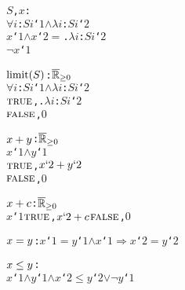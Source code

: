 \begin{alltt}
  \pvsid{(}\(S\), \(x\)\pvsid{)}:  \pvskey{=}
       \pvsid{(}\(\forall\) \(i\): \(S\)\pvsid{(}\(i\)\pvsid{)}`\(1\)\pvsid{)} \(\wedge\) \pvsid{(}\(\lambda\) \(i\): \(S\)\pvsid{(}\(i\)\pvsid{)}`\(2\)\pvsid{)}
         \(x\)`\(1\) \(\wedge\) \(x\)`\(2\) \(=\) .\pvsid{(}\(\lambda\) \(i\): \(S\)\pvsid{(}\(i\)\pvsid{)}`\(2\)\pvsid{)}
       \(\neg\) \(x\)`\(1\)
      \vspace*{\pvsdeclspacing}

  \(\xunderscorelimitonefn{S}\): \({\pvssubscript{\overline{\mathbb{R}}}{{\geq}0}}\) \pvskey{=}
       \pvsid{(}\(\forall\) \(i\): \(S\)\pvsid{(}\(i\)\pvsid{)}`\(1\)\pvsid{)} \(\wedge\) \pvsid{(}\(\lambda\) \(i\): \(S\)\pvsid{(}\(i\)\pvsid{)}`\(2\)\pvsid{)}
         \pvsid{(}\({\pvskey{TRUE}}\), .\pvsid{(}\(\lambda\) \(i\): \(S\)\pvsid{(}\(i\)\pvsid{)}`\(2\)\pvsid{)}\pvsid{)}
       \pvsid{(}\({\pvskey{FALSE}}\), \(0\)\pvsid{)}
      \vspace*{\pvsdeclspacing}

  \(\xunderscoreaddtwofn{x}{y}\): \({\pvssubscript{\overline{\mathbb{R}}}{{\geq}0}}\) \pvskey{=}
       \(x\)`\(1\) \(\wedge\) \(y\)`\(1\)
         \pvsid{(}\({\pvskey{TRUE}}\), \(\opplustwofn{x`2}{y`2}\)\pvsid{)}
       \pvsid{(}\({\pvskey{FALSE}}\), \(0\)\pvsid{)}
      \vspace*{\pvsdeclspacing}

  \(\xunderscoreaddtwofn{x}{c}\): \({\pvssubscript{\overline{\mathbb{R}}}{{\geq}0}}\) \pvskey{=}
       \(x\)`\(1\)  \pvsid{(}\({\pvskey{TRUE}}\), \(\opplustwofn{x`2}{c}\)\pvsid{)}  \pvsid{(}\({\pvskey{FALSE}}\), \(0\)\pvsid{)} \vspace*{\pvsdeclspacing}

  \(\xunderscoreeqtwofn{x}{y}\):  \pvskey{=} \pvsid{(}\(x\)`\(1\) \(=\) \(y\)`\(1\)\pvsid{)} \(\wedge\) \pvsid{(}\(x\)`\(1\) \(\Rightarrow\) \(x\)`\(2\) \(=\) \(y\)`\(2\)\pvsid{)}\vspace*{\pvsdeclspacing}

  \(\xunderscoreletwofn{x}{y}\):  \pvskey{=}
      \pvsid{(}\(x\)`\(1\) \(\wedge\) \(y\)`\(1\) \(\wedge\) \(x\)`\(2\) \(\leq\) \(y\)`\(2\)\pvsid{)} \(\vee\) \pvsid{(}\(\neg\) \(y\)`\(1\)\pvsid{)}\vspace*{\pvsdeclspacing}


\end{alltt}

